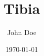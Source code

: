 \documentclass{article}
\begin{document}
\title{Tibia}
\author{John Doe}
\date{\today}
\maketitle  
\end{document}
